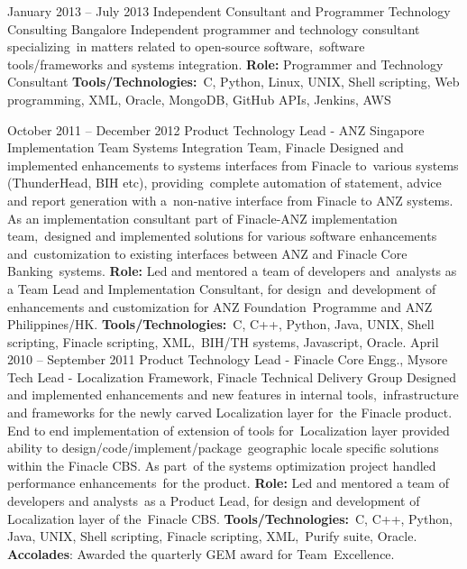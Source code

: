 \documentclass[11pt,a4paper,sans]{moderncv}
\begin{document}
\cventry
{January 2013 -- July 2013}
{Independent Consultant and Programmer}
{Technology Consulting}
{Bangalore}
{}
{Independent programmer and technology consultant specializing\
 in matters related to open-source software,\
 software tools/frameworks and systems integration.
\newline{}
\newline{}
\small {\textbf{Role:} Programmer and Technology Consultant}
\newline{}
\small {\textbf{Tools/Technologies:}\
C, Python, Linux, UNIX, Shell scripting, Web programming, XML, Oracle, MongoDB, GitHub APIs, Jenkins, AWS} 
\newline{}
}

\cventry
{October 2011 -- December 2012}
{Product Technology Lead - ANZ Singapore Implementation Team}
{Systems Integration Team, Finacle}
{}
{} 
{Designed and implemented enhancements to systems interfaces from Finacle to\
various  systems (ThunderHead, BIH etc), providing\
complete automation of statement, advice and report generation with a\
non-native interface from Finacle to ANZ systems. \\
As an implementation consultant part of Finacle-ANZ implementation team,\
designed and implemented solutions for various software enhancements and\
customization to existing interfaces between ANZ and Finacle Core Banking\
systems.
\newline{}
\newline{}
\small {\textbf{Role:} Led and mentored a team of developers and\
	analysts as a Team Lead and Implementation Consultant, for design\
	and development of enhancements and customization for ANZ Foundation\
Programme and ANZ Philippines/HK.}
\newline{}
\small {\textbf{Tools/Technologies:}\
C, C++, Python, Java, UNIX, Shell scripting, Finacle scripting, XML,\
BIH/TH systems, Javascript, Oracle.} 
\newline{}
}
\cventry
{April 2010 -- September 2011}
{Product Technology Lead - Finacle Core Engg., Mysore}
{Tech Lead - Localization Framework, Finacle Technical Delivery Group}
{\colorhref{infosys.com}{Infosys Ltd, Mysore}}
{}
{Designed and implemented enhancements and new features in internal tools,\
infrastructure and frameworks for the newly carved Localization layer for\
the Finacle product. End to end implementation of extension of tools for\
Localization layer provided ability to design/code/implement/package\
geographic locale specific solutions within the Finacle CBS. As part\
of the systems optimization project handled performance enhancements\
for the product.
\newline{}
\newline{}
\small {\textbf{Role:} Led and mentored a team of developers and analysts\
	as a Product Lead, for design and development of Localization layer of the\
	Finacle CBS.}
\newline{}
\small {\textbf{Tools/Technologies:}\
C, C++, Python, Java, UNIX, Shell scripting, Finacle scripting, XML,\
Purify suite, Oracle.} 
\newline{}
\small {\textbf{Accolades}: Awarded the quarterly GEM award for Team\
Excellence.}
\newline{}
}
\end{document}
